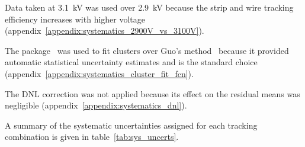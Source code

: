 Data taken at 3.1~kV was used over 2.9~kV because the strip and wire tracking efficiency increases with higher voltage~\cite{lefebvre_thesis} (appendix~\ref{appendix:systematics_2900V_vs_3100V}).

The  package~\cite{hatlo_developments_2005} was used to fit clusters over Guo's method~\cite{guo_simple_2011} because it provided automatic statistical uncertainty estimates and is the standard choice (appendix~\ref{appendix:systematics_cluster_fit_fcn}).

The DNL correction was not applied because its effect on the residual means was negligible (appendix~\ref{appendix:systematics_dnl}).

A summary of the systematic uncertainties assigned for each tracking combination is given in table~\ref{tab:sys_uncerts}.

